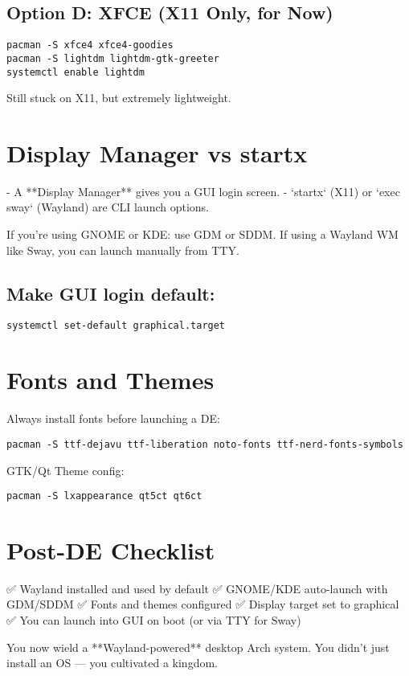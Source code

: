 \documentclass[12pt]{book}
\begin{document}
\subsection*{Option D: XFCE (X11 Only, for Now)}

\begin{lstlisting}
pacman -S xfce4 xfce4-goodies
pacman -S lightdm lightdm-gtk-greeter
systemctl enable lightdm
\end{lstlisting}

Still stuck on X11, but extremely lightweight.

\section{Display Manager vs startx}

- A **Display Manager** gives you a GUI login screen.
- `startx` (X11) or `exec sway` (Wayland) are CLI launch options.

If you're using GNOME or KDE: use GDM or SDDM.  
If using a Wayland WM like Sway, you can launch manually from TTY.

\subsection*{Make GUI login default:}

\begin{lstlisting}
systemctl set-default graphical.target
\end{lstlisting}

\section{Fonts and Themes}

Always install fonts before launching a DE:

\begin{lstlisting}
pacman -S ttf-dejavu ttf-liberation noto-fonts ttf-nerd-fonts-symbols
\end{lstlisting}

GTK/Qt Theme config:

\begin{lstlisting}
pacman -S lxappearance qt5ct qt6ct
\end{lstlisting}

\section{Post-DE Checklist}

✅ Wayland installed and used by default  
✅ GNOME/KDE auto-launch with GDM/SDDM  
✅ Fonts and themes configured  
✅ Display target set to graphical  
✅ You can launch into GUI on boot (or via TTY for Sway)

You now wield a **Wayland-powered** desktop Arch system. You didn’t just install an OS — you cultivated a kingdom.

\clearpage
\end{document}
